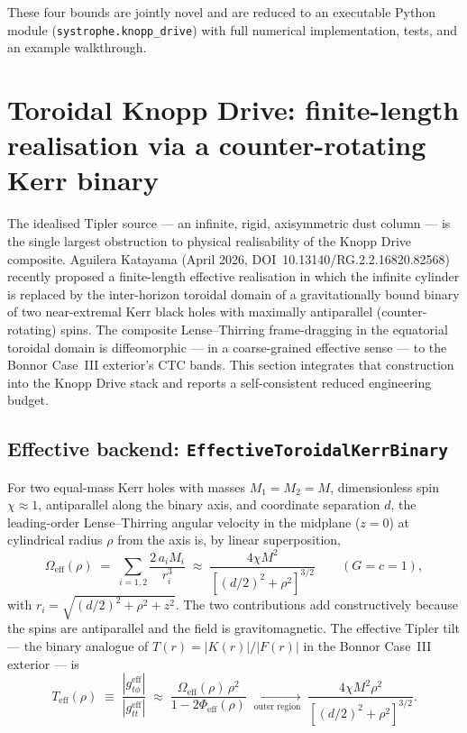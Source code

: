 \documentclass[11pt,a4paper]{article}
\begin{document}
These four bounds are jointly novel and are reduced to an executable Python module (\texttt{systrophe.knopp\_drive}) with full numerical implementation, tests, and an example walkthrough.

\section{Toroidal Knopp Drive: finite-length realisation via a counter-rotating Kerr binary}\label{sec:toroidal}

The idealised Tipler source --- an infinite, rigid, axisymmetric dust column --- is the single largest obstruction to physical realisability of the Knopp Drive composite. Aguilera Katayama (April 2026, DOI~10.13140/RG.2.2.16820.82568) recently proposed a finite-length effective realisation in which the infinite cylinder is replaced by the inter-horizon toroidal domain of a gravitationally bound binary of two near-extremal Kerr black holes with maximally antiparallel (counter-rotating) spins. The composite Lense--Thirring frame-dragging in the equatorial toroidal domain is diffeomorphic --- in a coarse-grained effective sense --- to the Bonnor Case~III exterior's CTC bands. This section integrates that construction into the Knopp Drive stack and reports a self-consistent reduced engineering budget.

\subsection{Effective backend: \texttt{EffectiveToroidalKerrBinary}}

For two equal-mass Kerr holes with masses $M_{1}=M_{2}=M$, dimensionless spin $\chi\approx 1$, antiparallel along the binary axis, and coordinate separation $d$, the leading-order Lense--Thirring angular velocity in the midplane ($z=0$) at cylindrical radius $\rho$ from the axis is, by linear superposition,
\begin{equation}
\Omega_{\mathrm{eff}}(\rho) \;=\; \sum_{i=1,2}\frac{2\,a_{i}M_{i}}{r_{i}^{3}}
\;\approx\; \frac{4\chi M^{2}}{[(d/2)^{2}+\rho^{2}]^{3/2}}\qquad(G=c=1),
\end{equation}
with $r_{i}=\sqrt{(d/2)^{2}+\rho^{2}+z^{2}}$. The two contributions add constructively because the spins are antiparallel and the field is gravitomagnetic. The effective Tipler tilt --- the binary analogue of $T(r)=|K(r)|/|F(r)|$ in the Bonnor Case~III exterior --- is
\begin{equation}\label{eq:Teff}
T_{\mathrm{eff}}(\rho) \;\equiv\; \frac{|g_{t\phi}^{\mathrm{eff}}|}{|g_{tt}^{\mathrm{eff}}|}
\;\approx\;\frac{\Omega_{\mathrm{eff}}(\rho)\,\rho^{2}}{1-2\Phi_{\mathrm{eff}}(\rho)}
\;\xrightarrow[\text{outer region}]{}\;\frac{4\chi M^{2}\rho^{2}}{[(d/2)^{2}+\rho^{2}]^{3/2}}.
\end{equation}
\end{document}
